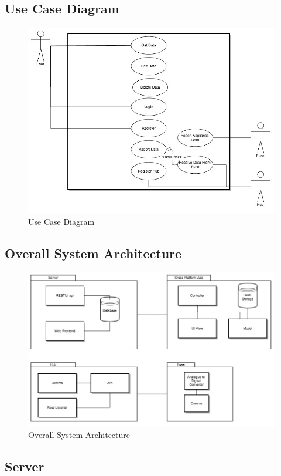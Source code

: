 \documentclass[draft,preprint,12pt,3p]{elsarticle}
\begin{document}
\subsection{Use Case Diagram}
\begin{figure}[H]
    \includegraphics[width=\columnwidth]{diagrams/UseCase}
    \caption {Use Case Diagram}
\end{figure}
\subsection{Overall System Architecture}
\begin{figure}[H]
    \includegraphics[width=\columnwidth]{diagrams/Architecture}
    \caption {Overall System Architecture}
\end{figure}

\subsection{Server}
\end{document}
